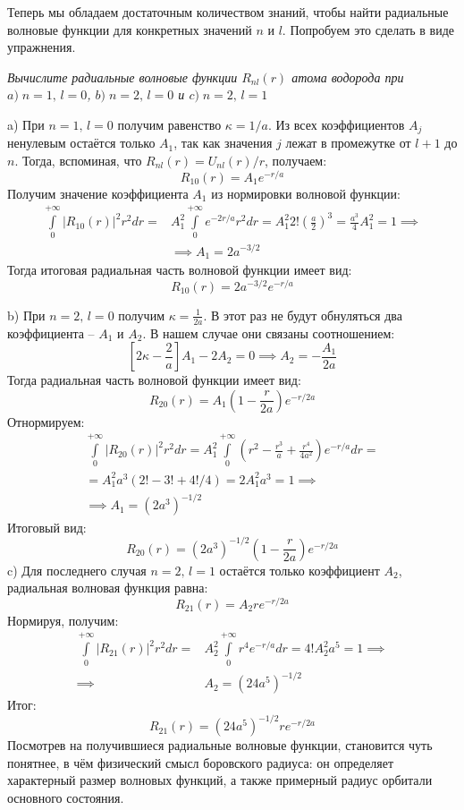 Теперь мы обладаем достаточным количеством знаний, чтобы найти радиальные волновые функции для конкретных значений $n$ и $l$. Попробуем это сделать в виде упражнения.
\newpage
{}
\begin{center}
    \textit{Вычислите радиальные волновые функции $R_{nl}(r)$ атома водорода при $ a)\;n = 1,\, l =0$, $b)\;n = 2,\, l =0$ и $c)\;n = 2,\, l =1$}
\end{center}

a)  При $n = 1,\, l=0$ получим равенство $\kappa = 1/a$. Из всех коэффициентов $A_j$ ненулевым остаётся только $A_1$, так как значения $j$ лежат в промежутке от $l+1$ до $n$. Тогда, вспоминая, что $R_{nl}(r) = U_{nl}(r)/r$, получаем:
\[
R_{10}(r) = A_1e^{-r/a}
\]
Получим значение коэффициента $A_1$ из нормировки волновой функции:
\begin{align*}
\int\limits_0^{+\infty}|R_{10}(r)|^2 r^2 dr = & A^2_1\int\limits_0^{+\infty}e^{-2r/a}r^2 dr = A^2_1 2!\left(\frac{a}{2}\right)^3 = \frac{a^3}{4}A^2_1 = 1 \implies \\ 
&\implies A_1 = 2a^{-3/2}
\end{align*}
Тогда итоговая радиальная часть волновой функции имеет вид:
\[
R_{10}(r) = 2a^{-3/2}e^{-r/a}
\]

b) При $n = 2,\, l=0$ получим $\kappa = \frac{1}{2a}$. В этот раз не будут обнуляться два коэффициента -- $A_1$ и $A_2$. В нашем случае они связаны соотношением:
\[
\left[ 2\kappa - \frac{2}{a} \right]A_1 - 2A_2 = 0 \implies A_2 = -\frac{A_1}{2a}
\]
Тогда радиальная часть волновой функции имеет вид:
\[
R_{20}(r) = A_1\left( 1 - \frac{r}{2a} \right) e^{-r/2a}
\]
Отнормируем:
\begin{gather*}
\int\limits_0^{+\infty}|R_{20}(r)|^2 r^2 dr = A^2_1\int\limits_0^{+\infty}\left( r^2 - \frac{r^3}{a} +\frac{r^4}{4a^2} \right)e^{-r/a} dr = \\ 
= A^2_1 a^3 (2! - 3! + 4!/4) = 2A^2_1 a^3 = 1 \implies \\ 
\implies A_1 = (2a^3)^{-1/2}
\end{gather*}
Итоговый вид:
\[
R_{20}(r) = (2a^3)^{-1/2}\left( 1 - \frac{r}{2a} \right) e^{-r/2a}
\]
c) Для последнего случая $n=2,\, l=1$ остаётся только коэффициент $A_2$, радиальная волновая функция равна:
\[
R_{21}(r) = A_2re^{-r/2a}
\]
Нормируя, получим:
\begin{align*}    
\int\limits_0^{+\infty}|R_{21}(r)|^2 r^2 dr = & A^2_2\int\limits_0^{+\infty}r^4 e^{-r/a} dr = 4! A^2_2 a^5 = 1 \implies \\ \implies & A_2 = (24a^5)^{-1/2}
\end{align*}
Итог:
\[
R_{21}(r) = (24a^5)^{-1/2}re^{-r/2a}
\]
Посмотрев на получившиеся радиальные волновые функции, становится чуть понятнее, в чём физический смысл боровского радиуса: он определяет характерный размер волновых функций, а также примерный радиус орбитали основного состояния.

